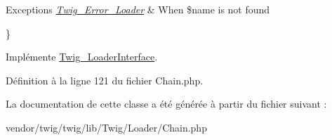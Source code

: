 \begin{DoxyExceptions}{Exceptions}
{\em \hyperlink{class_twig___error___loader}{Twig\+\_\+\+Error\+\_\+\+Loader}} & When \$name is not found\\
\hline
\end{DoxyExceptions}
\} 

Implémente \hyperlink{interface_twig___loader_interface_a3ee0419b212dc4f6f1e8a5a615423ad8}{Twig\+\_\+\+Loader\+Interface}.



Définition à la ligne 121 du fichier Chain.\+php.



La documentation de cette classe a été générée à partir du fichier suivant \+:\begin{DoxyCompactItemize}
\item 
vendor/twig/twig/lib/\+Twig/\+Loader/Chain.\+php\end{DoxyCompactItemize}

